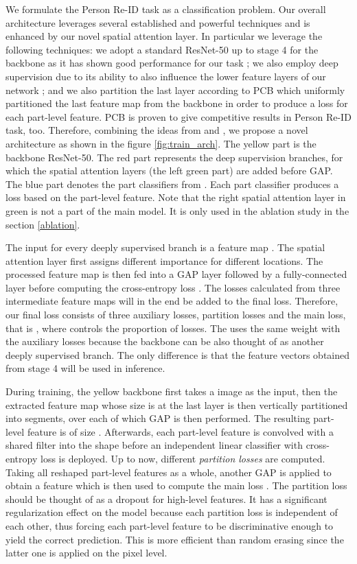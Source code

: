\documentclass[10pt,twocolumn,letterpaper]{article}
\begin{document}
We formulate the Person Re-ID task as a classification problem.
Our overall architecture leverages several established and powerful techniques and is enhanced by our novel spatial attention layer.
In particular we leverage the following techniques:
we adopt a standard ResNet-50 up to stage 4 for the backbone as it has shown good performance for our task \cite{pcb, dare, aacn};
we also employ deep supervision due to its ability to also influence the lower feature layers of our network \cite{dare}; and we also partition the last layer according to PCB \cite{pcb} which uniformly partitioned the last feature map from the backbone in order to produce a loss for each part-level feature. PCB is proven to give competitive results in Person Re-ID task, too.
Therefore, combining the ideas from \cite{dare} and \cite{pcb}, we propose a novel architecture as shown in the figure \ref{fig:train_arch}. The yellow part is the backbone ResNet-50. The red part represents the deep supervision branches, for which the spatial attention layers (the left green part) are added before GAP. The blue part denotes the part classifiers from \cite{pcb}. Each part classifier produces a loss based on the part-level feature. Note that the right spatial attention layer in green is not a part of the main model. It is only used in the ablation study in the section \ref{ablation}.




The input for every deeply supervised branch is a feature map . The spatial attention layer first assigns different importance for different locations. The processed feature map is then fed into a GAP layer followed by a fully-connected layer before computing the cross-entropy loss . The losses calculated from three intermediate feature maps will in the end be added to the final loss. Therefore, our final loss  consists of three auxiliary losses, partition losses and the main loss, that is , where  controls the proportion of losses. The  uses the same weight with the auxiliary losses because the backbone can be also thought of as another deeply supervised branch. The only difference is that the feature vectors obtained from stage 4 will be used in inference.

During training, the yellow backbone first takes a image as the input, then the extracted feature map whose size is  at the last layer is then vertically partitioned into  segments, over each of which GAP is then performed. The resulting part-level feature is of size . Afterwards, each part-level feature is convolved with a shared  filter into the shape  before an independent linear classifier with cross-entropy loss is deployed. Up to now,  different \textit{partition losses}  are computed. Taking all  reshaped part-level features as a whole, another GAP is applied to obtain a  feature which is then used to compute the main loss . The partition loss should be thought of as a dropout \cite{dropout} for high-level features. It has a significant regularization effect on the model because each partition loss is independent of each other, thus forcing each part-level feature to be discriminative enough to yield the correct prediction. This is more efficient than random erasing \cite{random_erase} since the latter one is applied on the pixel level.
\end{document}
